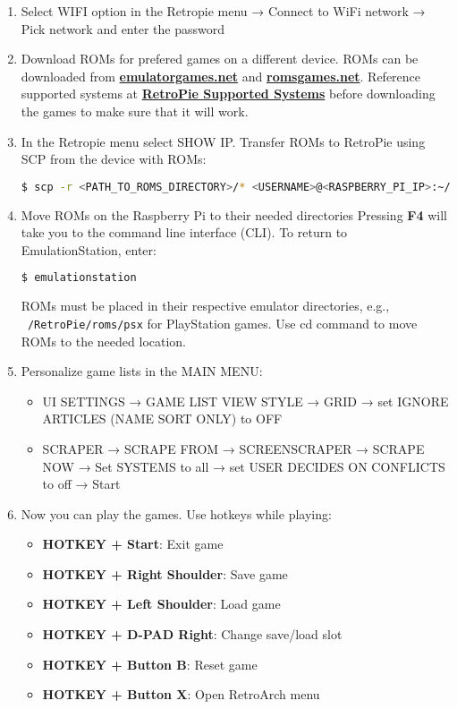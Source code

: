 \begin{enumerate}
\item Select WIFI option in the Retropie menu → Connect to WiFi network → Pick network and enter the password

\item Download ROMs for prefered games on a different device. ROMs can be downloaded from \href{https://www.emulatorgames.net}{\textbf{\color{blue}emulatorgames.net}} and \href{https://www.romsgames.net}{\textbf{\color{blue}romsgames.net}}. Reference supported systems at \href{https://retropie.org.uk/docs/Supported-Systems/}{\textbf{\color{blue}RetroPie Supported Systems}} before downloading the games to make sure that it will work.

\item In the Retropie menu select SHOW IP. Transfer ROMs to RetroPie using SCP from the device with ROMs:
\begin{lstlisting}[language=bash, breaklines=true, breakatwhitespace=true, columns=fullflexible]
$ scp -r <PATH_TO_ROMS_DIRECTORY>/* <USERNAME>@<RASPBERRY_PI_IP>:~/RetroPie/roms/
\end{lstlisting} 

\item Move ROMs on the Raspberry Pi to their needed directories
Pressing \textbf{F4} will take you to the command line interface (CLI). To return to EmulationStation, enter:
\begin{lstlisting}[language=bash, breaklines=true, breakatwhitespace=true, columns=fullflexible]
$ emulationstation
\end{lstlisting}
ROMs must be placed in their respective emulator directories, e.g., \texttt{~/RetroPie/roms/psx} for PlayStation games. Use cd command to move ROMs to the needed location.

\item Personalize game lists in the MAIN MENU:
\begin{itemize}
\item UI SETTINGS → GAME LIST VIEW STYLE → GRID → set IGNORE ARTICLES (NAME SORT ONLY) to OFF
\item SCRAPER → SCRAPE FROM → SCREENSCRAPER → SCRAPE NOW → Set SYSTEMS to all → set USER DECIDES ON CONFLICTS to off → Start
\end{itemize}

\item Now you can play the games. Use hotkeys while playing:
\begin{itemize}
\item \textbf{HOTKEY + Start}: Exit game
\item \textbf{HOTKEY + Right Shoulder}: Save game
\item \textbf{HOTKEY + Left Shoulder}: Load game
\item \textbf{HOTKEY + D-PAD Right}: Change save/load slot
\item \textbf{HOTKEY + Button B}: Reset game
\item \textbf{HOTKEY + Button X}: Open RetroArch menu
\end{itemize}


\end{enumerate}
